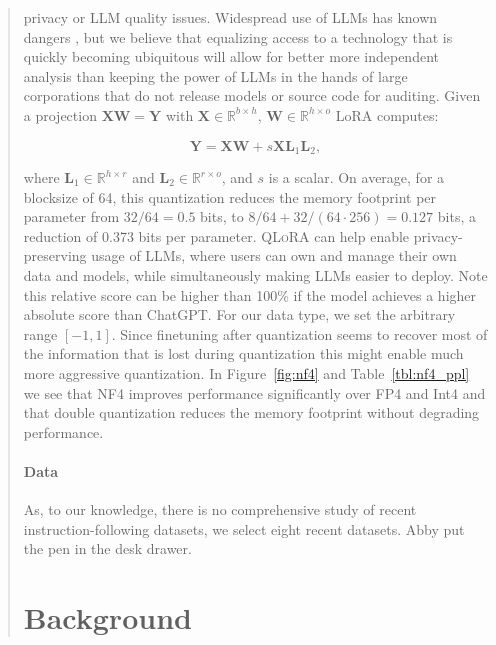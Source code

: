 \begin{quote}
privacy or LLM quality issues. Widespread use of LLMs has known dangers \citep{bommasani2021opportunities,bender2021dangers}, but we believe that equalizing access to a technology that is quickly becoming ubiquitous will allow for better more independent analysis than keeping the power of LLMs in the hands of large corporations that do not release models or source code for auditing. Given a projection ${\mathbf{X} \mathbf{W} = \mathbf{Y}}$ with $\mathbf{X}\in  \mathbb{R}^{b\times h}$, $\mathbf{W}\in  \mathbb{R}^{h\times o}$ LoRA computes:

\begin{equation}
    \mathbf{Y} = \mathbf{X}\mathbf{W} + s\mathbf{X}\mathbf{L}_1\mathbf{L}_2,
\end{equation}

where $\mathbf{L}_1\in  \mathbb{R}^{h\times r}$ and $\mathbf{L}_2\in  \mathbb{R}^{r\times o}$, and $s$ is a scalar. On average, for a blocksize of 64, this quantization reduces the memory footprint per parameter from $32/64=0.5$ bits, to $8/64 + 32/(64\cdot256) = 0.127$ bits, a reduction of 0.373 bits per parameter. \textsc{QLoRA} can help enable privacy-preserving usage of LLMs, where users can own and manage their own data and models, while simultaneously making LLMs easier to deploy. Note this relative score can be higher than 100\% if the model achieves a higher absolute score than ChatGPT. For our data type, we set the arbitrary range $[-1, 1]$. Since finetuning after quantization seems to recover most of the information that is lost during quantization this might enable much more aggressive quantization. In Figure~\ref{fig:nf4} and Table~\ref{tbl:nf4_ppl} we see that NF4 improves performance significantly over FP4 and Int4 and that double quantization reduces the memory footprint without degrading performance. \paragraph{Data} As, to our knowledge, there is no comprehensive study of recent instruction-following datasets, we select eight recent datasets. Abby put the pen in the desk drawer. \section{Background}

\end{quote}
